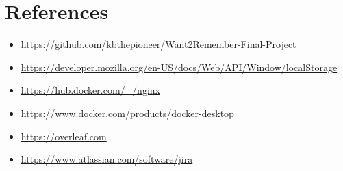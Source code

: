 \documentclass[12pt]{article}
\begin{document}
\section{References}

\begin{itemize}
  \item \url{https://github.com/kbthepioneer/Want2Remember-Final-Project}
  \item \url{https://developer.mozilla.org/en-US/docs/Web/API/Window/localStorage}
  \item \url{https://hub.docker.com/_/nginx}
  \item \url{https://www.docker.com/products/docker-desktop}
  \item \url{https://overleaf.com}
  \item \url{https://www.atlassian.com/software/jira}
\end{itemize}
\end{document}
